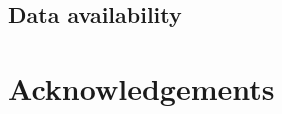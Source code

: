 \documentclass[11pt,oneside,letterpaper]{article}
\begin{document}
\subsection*{Data availability}


\section*{Acknowledgements}



\end{document}
